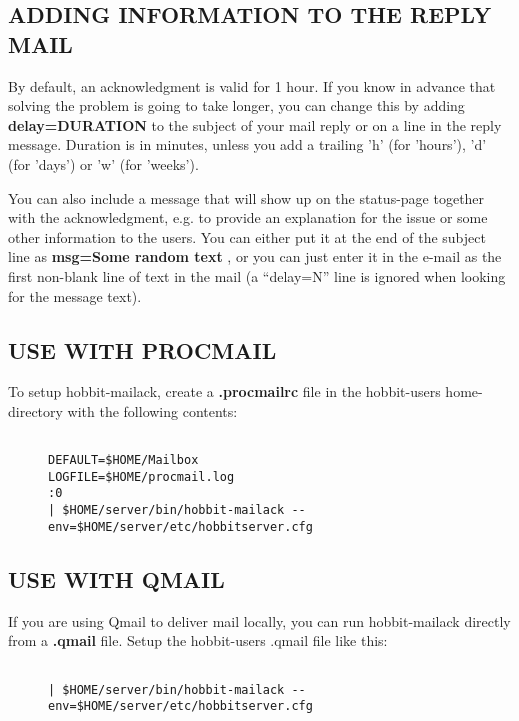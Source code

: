 
\subsection{ADDING INFORMATION TO THE REPLY MAIL}
 By default, an acknowledgment is valid for 1 hour. If you know in advance that solving the problem is going to take longer, you can change this by adding \textbf{delay=DURATION}
 to the subject of your mail reply or on a line in the reply message. Duration is in minutes, unless you add a trailing 'h' (for 'hours'), 'd' (for 'days') or 'w' (for 'weeks'). 

  You can also include a message that will show up on the status-page together with the acknowledgment, e.g. to provide an explanation for the issue or some other information to the users. You can either put it at the end of the subject line as \textbf{msg=Some random text}
, or you can just enter it in the e-mail as the first non-blank line of text in the mail (a ``delay=N'' line is ignored when looking for the message text). 


 
\subsection{USE WITH PROCMAIL}
 To setup hobbit-mailack, create a \textbf{.procmailrc}
 file in the hobbit-users home-directory with the following contents: \begin{description}
\item[]\begin{verbatim}

DEFAULT=$HOME/Mailbox
LOGFILE=$HOME/procmail.log
:0
| $HOME/server/bin/hobbit-mailack --env=$HOME/server/etc/hobbitserver.cfg

\end{verbatim}


 


\end{description}
\subsection{USE WITH QMAIL}
 If you are using Qmail to deliver mail locally, you can run hobbit-mailack directly from a \textbf{.qmail}
 file. Setup the hobbit-users .qmail file like this: \begin{description}
\item[]\begin{verbatim}

| $HOME/server/bin/hobbit-mailack --env=$HOME/server/etc/hobbitserver.cfg

\end{verbatim}


 


\end{description}
